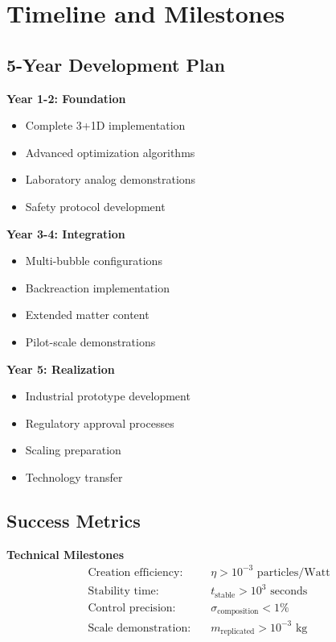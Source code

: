 \documentclass[11pt]{article}
\begin{document}
\section{Timeline and Milestones}

\subsection{5-Year Development Plan}

\textbf{Year 1-2: Foundation}
\begin{itemize}
\item Complete 3+1D implementation
\item Advanced optimization algorithms
\item Laboratory analog demonstrations
\item Safety protocol development
\end{itemize}

\textbf{Year 3-4: Integration}
\begin{itemize}
\item Multi-bubble configurations
\item Backreaction implementation
\item Extended matter content
\item Pilot-scale demonstrations
\end{itemize}

\textbf{Year 5: Realization}
\begin{itemize}
\item Industrial prototype development
\item Regulatory approval processes
\item Scaling preparation
\item Technology transfer
\end{itemize}

\subsection{Success Metrics}

\textbf{Technical Milestones}
\begin{align}
\text{Creation efficiency:} &\quad \eta > 10^{-3} \text{ particles/Watt} \\
\text{Stability time:} &\quad t_{\text{stable}} > 10^{3} \text{ seconds} \\
\text{Control precision:} &\quad \sigma_{\text{composition}} < 1\% \\
\text{Scale demonstration:} &\quad m_{\text{replicated}} > 10^{-3} \text{ kg}
\end{align}
\end{document}
